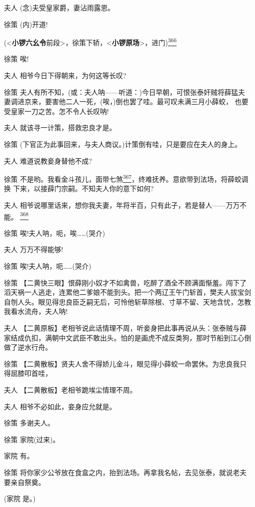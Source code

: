 夫人 (念)夫受皇家爵，妻沾雨露恩。

徐策 (内)开道!

(\textless{}\textbf{小锣六幺令}前段\textgreater{}，徐策下轿，\textless{}\textbf{小锣原场}\textgreater{}，进门)\protect\hyperlink{fn366}{\textsuperscript{366}}

徐策 唉!

夫人 相爷今日下得朝来，为何这等长叹?

徐策
夫人有所不知，(或：夫人呐------听道：)今日早朝，可恨张泰奸贼将薛猛夫
妻调进京来，要害他二人一死，(唉，)倒也罢了哇。最可叹未满三月小薛蛟，
也要受皇家一刀之苦。怎不令人长叹呐!

夫人 就该寻一计策，搭救忠良才是。

徐策 (下官正为此事回来，与夫人商议。)计策倒有哇，只是要应在夫人的身上。

夫人 难道说教妾身替他不成?

徐策
不是哟。我看金斗孩儿，面带七煞\protect\hyperlink{fn367}{\textsuperscript{367}}，终难抚养。意欲带到法场，将薛蛟调换
下来，以接薛门宗嗣。不知夫人你的意下如何?

夫人
相爷说哪里话来，想你我夫妻，年将半百，只有此子，若是替人------万万不能。
\protect\hyperlink{fn368}{\textsuperscript{368}}

徐策 唉!夫人呐，呃，唉\ldots{}\ldots{}(哭介)

夫人 万万不得能够!

徐策 唉!夫人呐，呃\ldots{}\ldots{}(哭介)

徐策
【二黄快三眼】恨薛刚小奴才不如禽兽，吃醉了酒全不顾满面惭羞。闯下了滔天祸一人逃走，连累他二爹娘不能到头。把一个两辽王午门斩首，樊夫人拔宝剑自刎人头。眼见得忠良臣乏嗣无后，可怜他斩草除根、寸草不留、天地含忧，怎教我看水流舟，夫人呐!

夫人
【二黄原板】老相爷说此话情理不周，听妾身把此事再说从头：张泰贼与薛家结成仇扣，满朝中文武臣不敢出头。怕的是画虎不成反类狗，那时节船到江心倒做了逆水行舟。

徐策
【二黄散板】贤夫人舍不得娇儿金斗，眼见得小薛蛟一命罢休。为忠良我只得屈膝叩首哇，

夫人 【二黄散板】老相爷跪埃尘情理不周。

夫人 相爷不必如此，妾身应允就是。

徐策 多谢夫人。

徐策 家院(过来)。

家院 有。

徐策 将你家少公爷放在食盒之内，抬到法场。再拿我名帖，去见张泰，就说老夫
要亲自祭奠。

(家院 是。)

